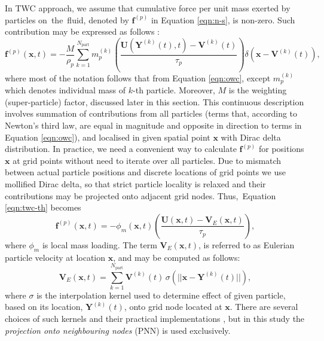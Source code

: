 \documentclass{pracamgren}
\begin{document}
In TWC approach, we assume that cumulative force per unit mass exerted by particles on~the~fluid, denoted by $\mathbf{f}^{(p)}$ in Equation \ref{eqn:n-s}, is non-zero.
Such contribution may be expressed as follows \parencite{Bosse2006,Monchaux2017,Rosa2022}:
\begin{equation}
\mathbf{f}^{(p)}(\mathbf{x}, t) = - \frac{M}{\rho_{p}} \sum_{k=1}^{N_{\text{part}}} m^{(k)}_{p} \left( \frac{ \mathbf{U}(\mathbf{Y}^{(k)}(t), t) - \mathbf{V}^{(k)}(t) }{\tau_{p}} \right) \delta \left( \mathbf{x} - \mathbf{V}^{(k)}(t) \right) ,
\label{eqn:twc-th}
\end{equation}
where most of the notation follows that from Equation \ref{eqn:owc}, except $m^{(k)}_{p}$ which denotes individual mass of $k$-th particle.
Moreover, $M$ is the weighting (super-particle) factor, discussed later in this section.
This continuous description involves summation of contributions from all particles (terms that, according to Newton's third law, are equal in magnitude and opposite in direction to terms in Equation \ref{eqn:owc}), and localised in given spatial point $\mathbf{x}$ with Dirac delta distribution.
In practice, we need a convenient way to calculate $\mathbf{f}^{(p)}$ for positions $\mathbf{x}$ at grid points without need to iterate over all particles.
Due to mismatch between actual particle positions and discrete locations of grid points we use mollified Dirac delta, so that strict particle locality is relaxed and their contributions may be projected onto adjacent grid nodes.
Thus,~Equation \ref{eqn:twc-th} becomes
\begin{equation}
\mathbf{f}^{(p)}(\mathbf{x}, t) = - \phi_{m}(\mathbf{x}, t) \left( \frac{ \mathbf{U}(\mathbf{x}, t) - \mathbf{V}_{E}(\mathbf{x}, t)}{\tau_{p}} \right) ,
\label{eqn:twc-px}
\end{equation}  
where $\phi_{m}$ is local mass loading. 
The term $\mathbf{V}_{E}(\mathbf{x}, t)$, is referred to as Eulerian particle velocity at location $\mathbf{x}$, and may be computed as follows:
\begin{equation}
\mathbf{V}_{E}(\mathbf{x}, t) = \sum_{k=1}^{N_{\text{part}}} \mathbf{V}^{(k)}(t) \, \sigma(|| \mathbf{x} - \mathbf{Y}^{(k)}(t) ||) ,
\label{eqn:twc-ve}
\end{equation}
where $\sigma$ is the interpolation kernel used to determine effect of given particle, based on its location, $\mathbf{Y}^{(k)}(t)$, onto grid node located at $\mathbf{x}$.
There are several choices of such kernels and their practical implementations \parencite{Garg2007}, but in this study the \emph{projection onto neighbouring nodes} (PNN) is used exclusively.
\end{document}
